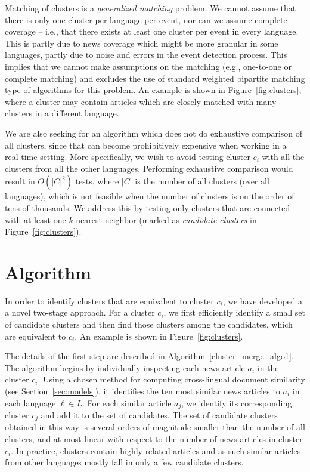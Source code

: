 Matching of clusters is a \emph{generalized matching} problem. We cannot assume that there is only 
one cluster per language per event, nor can we assume complete coverage -- i.e., that there exists 
at least one cluster per event in every language. This is partly due to news coverage which might 
be more granular in some languages, partly due to noise and errors in the event detection process. This 
implies that we cannot make assumptions on the matching (e.g., one-to-one or complete matching) and excludes 
the use of standard weighted bipartite matching type of algorithms for this problem. An example is shown in 
Figure~\ref{fig:clusters}, where a cluster may contain articles which are closely matched with many clusters in a different language.

We are also seeking for an algorithm which does not do exhaustive comparison of all clusters, 
since that can become prohibitively expensive when working in a real-time setting. More specifically, 
we wish to avoid testing cluster $c_i$ with all the clusters from all the other languages. 
Performing exhaustive comparison would result in $O(|C|^2)$ tests, where $|C|$ is the number of all 
clusters (over all languages), which is not feasible when the number of clusters is on the order of tens 
of thousands. We address this by testing only clusters that are connected with at least one $k$-nearest 
neighbor (marked as \emph{candidate clusters} in Figure~\ref{fig:clusters}).

\section{Algorithm}\label{algo:features}

In order to identify clusters that are equivalent to cluster $c_i$, we have developed a 
a novel two-stage approach. For a cluster $c_i$, we first efficiently identify a small set of 
candidate clusters and then find those clusters among the candidates, which are 
equivalent to $c_i$. An example is  shown in  Figure~\ref{fig:clusters}.

The details of the first step are described in Algorithm~\ref{cluster_merge_algo1}. The algorithm 
begins by individually inspecting each news article $a_i$ in the cluster $c_i$. Using a chosen 
method for computing cross-lingual document similarity (see Section~\ref{sec:models}), it identifies 
the ten most similar news articles to $a_i$ in each language $\ell \in L$. For each similar 
article $a_j$, we identify its corresponding  cluster $c_j$ and add it to the set of candidates. 
The set of candidate clusters obtained in this way is several orders of magnitude smaller than the 
number of all clusters, and at most linear with respect to the number of news articles in 
cluster $c_i$. In practice, clusters contain highly related articles and as such similar 
articles from other languages mostly fall in only a few candidate clusters.

